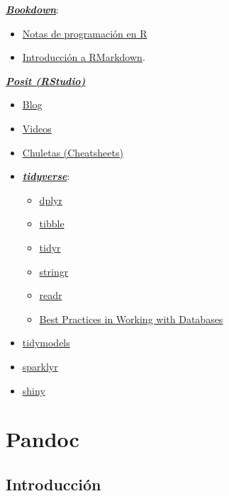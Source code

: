 \documentclass[
]{book}
\theoremstyle{break}
\theoremstyle{nonumberplain}
\begin{document}
\href{https://bookdown.org}{\textbf{\emph{Bookdown}}}:

\begin{itemize}
\item
  \href{https://rubenfcasal.github.io/book_notasr/}{Notas de programación en R}
\item
  \href{https://rubenfcasal.github.io/bookdown_intro/rmarkdown.html}{Introducción a RMarkdown}.
\end{itemize}

\href{https://posit.co}{\textbf{\emph{Posit (RStudio)}}}

\begin{itemize}
\item
  \href{https://posit.co/blog}{Blog}
\item
  \href{https://posit.co/resources/videos}{Videos}
\item
  \href{https://posit.co/resources/cheatsheets}{Chuletas (Cheatsheets)}
\item
  \href{https://www.tidyverse.org/}{\textbf{\emph{tidyverse}}}:

  \begin{itemize}
  \item
    \href{https://dplyr.tidyverse.org}{dplyr}
  \item
    \href{https://tibble.tidyverse.org}{tibble}
  \item
    \href{https://tidyr.tidyverse.org}{tidyr}
  \item
    \href{https://stringr.tidyverse.org}{stringr}
  \item
    \href{https://readr.tidyverse.org}{readr}
  \item
    \href{https://solutions.posit.co/connections/db}{Best Practices in Working with Databases}
  \end{itemize}
\item
  \href{https://www.tidymodels.org}{tidymodels}
\item
  \href{https://spark.rstudio.com/}{sparklyr}
\item
  \href{http://shiny.rstudio.com}{shiny}
\end{itemize}

\hypertarget{appendix-apuxe9ndices}{%
\appendix}


\hypertarget{pandoc}{%
\chapter{Pandoc}\label{pandoc}}

\hypertarget{introducciuxf3n}{%
\section{Introducción}\label{introducciuxf3n}}
\end{document}
